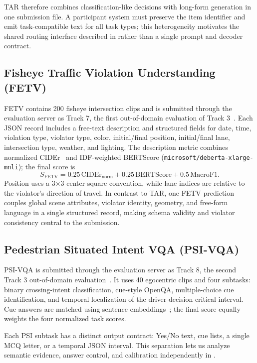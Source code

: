 \documentclass[runningheads]{llncs}
\begin{document}
TAR therefore combines classification-like decisions with long-form generation in one submission file. A participant system must preserve the item identifier and emit task-compatible text for all task types; this heterogeneity motivates the shared routing interface described in  rather than a single prompt and decoder contract.

\subsection{Fisheye Traffic Violation Understanding (FETV)}
FETV contains 200 fisheye intersection clips and is submitted through the evaluation server as Track 7, the first out-of-domain evaluation of Track 3~\cite{aicity2026track3}. Each JSON record includes a free-text description and structured fields for date, time, violation type, violator type, color, initial/final position, initial/final lane, intersection type, weather, and lighting. The description metric combines normalized CIDEr~\cite{cider} and IDF-weighted BERTScore (\texttt{microsoft/deberta-xlarge-mnli}); the final score is
\begin{equation}
S_{\mathrm{FETV}}=0.25\,\mathrm{CIDEr}_{\mathrm{norm}}+0.25\,\mathrm{BERTScore}+0.5\,\mathrm{MacroF1}.
\end{equation}
Position uses a 3$\times$3 center-square convention, while lane indices are relative to the violator's direction of travel. In contrast to TAR, one FETV prediction couples global scene attributes, violator identity, geometry, and free-form language in a single structured record, making schema validity and violator consistency central to the submission.

\subsection{Pedestrian Situated Intent VQA (PSI-VQA)}
PSI-VQA is submitted through the evaluation server as Track 8, the second Track 3 out-of-domain evaluation~\cite{aicity2026track3}. It uses 40 egocentric clips and four subtasks: binary crossing-intent classification, cue-style OpenQA, multiple-choice cue identification, and temporal localization of the driver-decision-critical interval. Cue answers are matched using sentence embeddings~\cite{sbert}; the final score equally weights the four normalized task scores.

Each PSI subtask has a distinct output contract: Yes/No text, cue lists, a single MCQ letter, or a temporal JSON interval. This separation lets us analyze semantic evidence, answer control, and calibration independently in .
\end{document}

